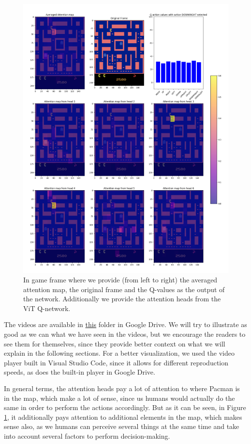 \begin{figure}[!h]
	\centering
	\includegraphics[width=0.75\linewidth]{figures/whole_attn_map}
	\caption{In game frame where we provide (from left to right) the averaged attention map, the original frame and the Q-values as the output of the network. Additionally we provide the attention heads from the ViT Q-network.}
	\label{fig:wholeattnmaps}
\end{figure}

The videos are available in \href{https://drive.google.com/drive/folders/1cABvE9vmXMyWWHmAqBzeffJOcFBc7GZD?usp=sharing}{this} folder in Google Drive. We will try to illustrate as good as we can what we have seen in the videos, but we encourage the readers to see them for themselves, since they provide better context on what we will explain in the following sections. For a better visualization, we used the video player built in Visual Studio Code, since it allows for different reproduction speeds, as does the built-in player in Google Drive.

In general terms, the attention heads pay a lot of attention to where Pacman is in the map, which make a lot of sense, since us humans would actually do the same in order to perform the actions accordingly. But as it can be seen, in Figure \ref{fig:wholeattnmaps}, it additionally pays attention to additional elements in the map, which makes sense also, as we humans can perceive several things at the same time and take into account several factors to perform decision-making.


